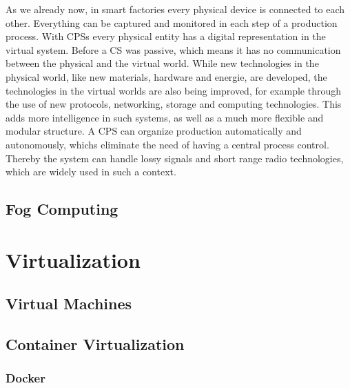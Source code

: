 As we already now, in smart factories every physical device is connected to each other.
Everything can be captured and monitored in each step of a production process.
With \acp{CPS} every physical entity has a digital representation in the virtual system.\cite[cf.][p. 1363]{Poovendran2010}
Before a \ac{CS} was passive, which means it has no communication between the physical and the virtual world.\cite[cf.][p. 1364]{Poovendran2010}
While new technologies in the physical world, like new materials, hardware and energie, are developed, the technologies in the virtual worlds are also being improved, for example through the use of new protocols, networking, storage and computing technologies.\cite[cf.][p. 1364]{Poovendran2010}
This adds more intelligence in such systems, as well as a much more flexible and modular structure.
A \ac{CPS} can organize production automatically and autonomously, whichs eliminate the need of having a central process control.\cite[cf.]{Lom}
Thereby the system can handle lossy signals and short range radio technologies, which are widely used in such a context.\cite[cf.]{Yannuzzi2014}


\subsection{Fog Computing}


\section{Virtualization}


\subsection{Virtual Machines}


\subsection{Container Virtualization}


\subsubsection{Docker}

